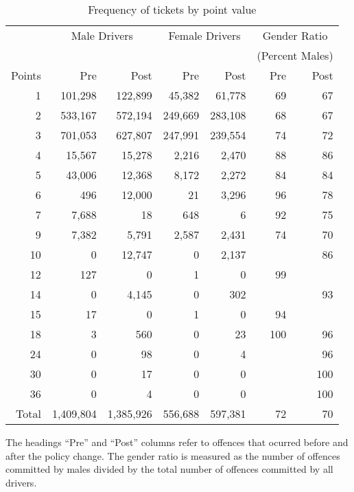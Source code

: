 
\begin{table}%
\centering
\begin{tabular}{r r r r r r r}
  \hline
		& \multicolumn{2}{c}{Male Drivers} 	&  \multicolumn{2}{c}{Female Drivers} &  \multicolumn{2}{c}{Gender Ratio} \\
 & & & & & \multicolumn{2}{c}{(Percent Males)} \\

 \cmidrule(lr){2-3}\cmidrule(lr){4-5}\cmidrule(lr){6-7} 
Points 	& Pre 		& Post		& Pre 		& Post		& Pre 	& Post		\\ 
  \hline
1 		& 101,298 	& 122,899	&  45,382 	&   61,778 	& 69 	& 67 \\ 
2 		& 533,167 	& 572,194	& 249,669 	& 283,108 	& 68 	& 67 \\ 
3 		& 701,053 	& 627,807	& 247,991	& 239,554	& 74 	& 72 \\ 
4 		&  15,567 	&  15,278 	&    2,216 	&    2,470 	& 88 	& 86 \\ 
5 		&  43,006 	&  12,368 	&    8,172 	&    2,272 	& 84 	& 84 \\ 
6 		&     496 	&  12,000 	&        21 	&    3,296 	& 96 	& 78 \\ 
7 		&   7,688 	&        18 	&      648 	&          6 	& 92 	& 75 \\ 
9 		&   7,382 	&    5,791 	&    2,587 	&    2,431 	& 74 	& 70 \\ 
10 		&         0 	&  12,747 	&         0 	&    2,137 	&  		& 86 \\ 
12 		&     127	&         0 	&         1 	&         0 	& 99 	&  \\ 
14 		&       0 	&   4,145 	&         0 	&      302 	&  		& 93 \\ 
15 		&      17 	&         0 	&         1 	&         0 	& 94 	&  \\ 
18 		&       3 	&      560 	&         0 	&        23 	& 100 	& 96 \\ 
24 		&       0 	&       98 	&         0 	&         4 	&  		& 96 \\ 
30 		&       0 	&       17 	&         0 	&         0 	&  		& 100 \\ 
36 		&       0 	&        4 	&         0 	&         0 	&  		& 100 \\ 

   \hline

Total 	  & 1,409,804 & 1,385,926 & 556,688 & 597,381 & 72 & 70 \\ 

   \hline
\end{tabular}
\caption{Frequency of tickets by point value} 
The headings ``Pre'' and ``Post'' columns refer to offences that ocurred before and after the policy change. 
The gender ratio is measured as the number of offences committed by males divided by the total number of offences committed by all drivers. 
\label{tab:penalties}
\end{table}